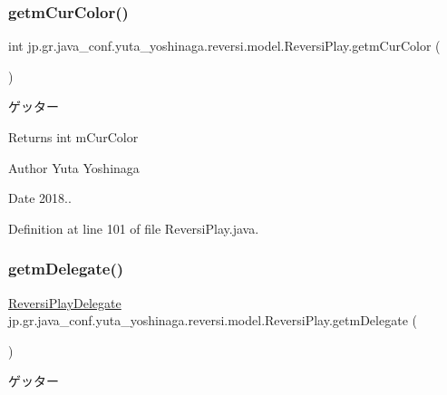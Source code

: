 \subsubsection{\texorpdfstring{getm\+Cur\+Color()}{getmCurColor()}}
{\footnotesize\ttfamily int jp.\+gr.\+java\+\_\+conf.\+yuta\+\_\+yoshinaga.\+reversi.\+model.\+Reversi\+Play.\+getm\+Cur\+Color (\begin{DoxyParamCaption}{ }\end{DoxyParamCaption})}



ゲッター 

\begin{DoxyReturn}{Returns}
int m\+Cur\+Color 
\end{DoxyReturn}
\begin{DoxyAuthor}{Author}
Yuta Yoshinaga 
\end{DoxyAuthor}
\begin{DoxyDate}{Date}
2018.. 
\end{DoxyDate}


Definition at line 101 of file Reversi\+Play.\+java.

\mbox{\label{classjp_1_1gr_1_1java__conf_1_1yuta__yoshinaga_1_1reversi_1_1model_1_1_reversi_play_a743606fc2f261d7303c76264c42c2ab0}} 
\subsubsection{\texorpdfstring{getm\+Delegate()}{getmDelegate()}}
{\footnotesize\ttfamily \hyperlink{classjp_1_1gr_1_1java__conf_1_1yuta__yoshinaga_1_1reversi_1_1model_1_1_reversi_play_delegate}{Reversi\+Play\+Delegate} jp.\+gr.\+java\+\_\+conf.\+yuta\+\_\+yoshinaga.\+reversi.\+model.\+Reversi\+Play.\+getm\+Delegate (\begin{DoxyParamCaption}{ }\end{DoxyParamCaption})}



ゲッター 

